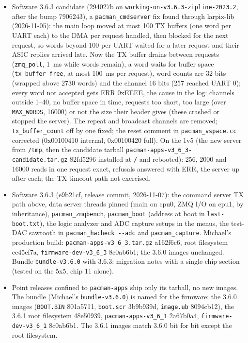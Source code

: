 \documentclass[11pt]{article}
\newcommand{\br}[1]{\texttt{#1}}
\newcommand{\h}[1]{\texttt{#1}}
\begin{document}
\begin{itemize}
\item Software 3.6.3 candidate (294027b on \br{working-on-v3.6.3-zipline-2023.2}, after the bump 7906243), a
  \h{pacman\_cmdserver} fix found through larpix-lib (2026-11-05):  the main loop moved at most 100 TX buffers (one
  word per UART each) to the DMA per request handled, then blocked for the next request, so words beyond 100 per
  UART waited for a later request and their ASIC replies arrived late.  Now the TX buffer drains between requests
  (\h{zmq\_poll}, 1~ms while words remain), a word waits for buffer space (\h{tx\_buffer\_free}, at most 100~ms
  per request), word counts are 32 bits (wrapped above 2730 words) and the channel 16 bits (257 reached UART 0);
  every word not accepted gets ERR 0xEEEE, the cause in the log:  channels outside 1--40, no buffer space in time,
  requests too short, too large (over \h{MAX\_WORDS}, 16000) or not the size their header gives (these crashed or
  stopped the server).  The repeat and broadcast channels are removed;  \h{tx\_buffer\_count} off by one fixed;
  the reset comment in \h{pacman\_vspace.cc} corrected (0x00100410 internal, 0x00100420 full).  On the 1v5 (the
  new server from \h{/tmp}, then the candidate tarball \h{pacman-apps-v3\_6\_3-candidate.tar.gz} 82fd5296
  installed at \h{/} and rebooted):  256, 2000 and 16000 reads in one request exact, refusals answered with ERR,
  the server up after each;  the TX timeout path not exercised.
\item Software 3.6.3 (e9b21cf, release commit, 2026-11-07):  the command server TX path above, data server threads
  pinned (main on cpu0, ZMQ I/O on cpu1, by inheritance), \h{pacman\_zmqbench}, \h{pacman\_boot} (address at boot in
  \h{last-boot.txt}), the logic analyzer and ADC capture setups in the menus, the test-DAC sawtooth in
  \h{pacman\_hwcheck -{}-adc} and \h{pacman\_capture}.  Michael's production build:  \h{pacman-apps-v3\_6\_3.tar.gz}
  a162f6c6, root filesystem ee45ef7a, \h{firmware-dev-v3\_6\_3} 8c0ab6b1;  the 3.6.0 images unchanged.  Bundle
  \h{bundle-v3.6.0} with 3.6.3;  migration notes with a single-chip section (tested on the 5x5, chip 11 alone).
\item Point releases confined to \h{pacman-apps} ship only its tarball, no new images.  The bundle
  (Michael's \h{bundle-v3.6.0}) is named for the firmware: the 3.6.0 images (\h{BOOT.BIN} 801a5711,
  \h{boot.scr} 3b9b939d, \h{image.ub} 8094cb12), the 3.6.1 root filesystem 48e50939, \h{pacman-apps-v3\_6\_1}
  2a67b0a4, \h{firmware-dev-v3\_6\_1} 8c0ab6b1.  The 3.6.1 images match 3.6.0 bit for bit except the root filesystem.
\end{itemize}
\end{document}
